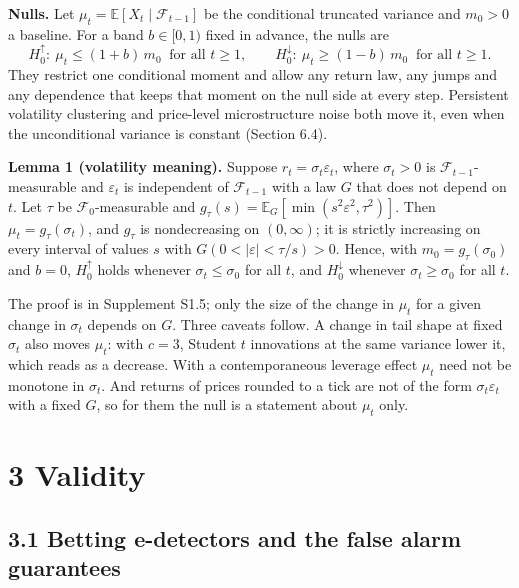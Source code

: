 \documentclass[
]{article}
\begin{document}
\textbf{Nulls.} Let \(\mu_t = \mathbb{E}[X_t \mid \mathcal{F}_{t-1}]\)
be the conditional truncated variance and \(m_0 > 0\) a baseline. For a
band \(b \in [0, 1)\) fixed in advance, the nulls are \[
H_0^{\uparrow}:\ \mu_t \le (1+b)\,m_0 \ \text{ for all } t \ge 1, \qquad H_0^{\downarrow}:\ \mu_t \ge (1-b)\,m_0 \ \text{ for all } t \ge 1.
\] They restrict one conditional moment and allow any return law, any
jumps and any dependence that keeps that moment on the null side at
every step. Persistent volatility clustering and price-level
microstructure noise both move it, even when the unconditional variance
is constant (Section 6.4).

\textbf{Lemma 1 (volatility meaning).} Suppose
\(r_t = \sigma_t \varepsilon_t\), where \(\sigma_t > 0\) is
\(\mathcal{F}_{t-1}\)-measurable and \(\varepsilon_t\) is independent of
\(\mathcal{F}_{t-1}\) with a law \(G\) that does not depend on \(t\).
Let \(\tau\) be \(\mathcal{F}_0\)-measurable and
\(g_\tau(s) = \mathbb{E}_G[\min(s^2\varepsilon^2, \tau^2)]\). Then
\(\mu_t = g_\tau(\sigma_t)\), and \(g_\tau\) is nondecreasing on
\((0, \infty)\); it is strictly increasing on every interval of values
\(s\) with \(G(0 < \lvert\varepsilon\rvert < \tau/s) > 0\). Hence, with
\(m_0 = g_\tau(\sigma_0)\) and \(b = 0\), \(H_0^{\uparrow}\) holds
whenever \(\sigma_t \le \sigma_0\) for all \(t\), and
\(H_0^{\downarrow}\) whenever \(\sigma_t \ge \sigma_0\) for all \(t\).

The proof is in Supplement S1.5; only the size of the change in
\(\mu_t\) for a given change in \(\sigma_t\) depends on \(G\). Three
caveats follow. A change in tail shape at fixed \(\sigma_t\) also moves
\(\mu_t\): with \(c = 3\), Student \(t\) innovations at the same
variance lower it, which reads as a decrease. With a contemporaneous
leverage effect \(\mu_t\) need not be monotone in \(\sigma_t\). And
returns of prices rounded to a tick are not of the form
\(\sigma_t\varepsilon_t\) with a fixed \(G\), so for them the null is a
statement about \(\mu_t\) only.

\hypertarget{validity}{%
\section{3 Validity}\label{validity}}

\hypertarget{betting-e-detectors-and-the-false-alarm-guarantees}{%
\subsection{3.1 Betting e-detectors and the false alarm
guarantees}\label{betting-e-detectors-and-the-false-alarm-guarantees}}
\end{document}
